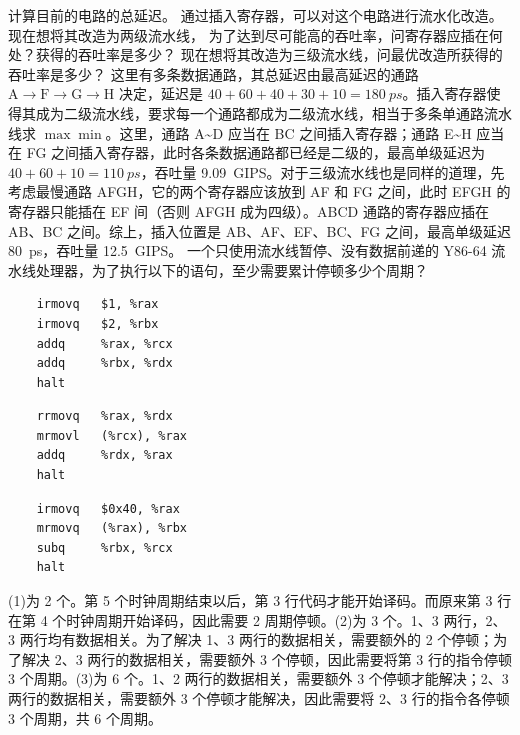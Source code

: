 \begin{problems}
\begin{figure}[H]
        \end{figure}
        \qn 计算目前的电路的总延迟。
        \qn 通过插入寄存器，可以对这个电路进行流水化改造。现在想将其改造为两级流水线， 为了达到尽可能高的吞吐率，问寄存器应插在何处？获得的吞吐率是多少？
        \qn 现在想将其改造为三级流水线，问最优改造所获得的吞吐率是多少？
        \sol 这里有多条数据通路，其总延迟由最高延迟的通路 $\mathrm A \to \mathrm F \to \mathrm G \to \mathrm H$ 决定，延迟是 $40+60+40+30+10 = \SI{180}{ps}$。插入寄存器使得其成为二级流水线，要求每一个通路都成为二级流水线，相当于多条单通路流水线求 $\max \min$。这里，通路 A\textasciitilde D 应当在 BC 之间插入寄存器；通路 E\textasciitilde H 应当在 FG 之间插入寄存器，此时各条数据通路都已经是二级的，最高单级延迟为 $40+60+10 = \SI{110}{ps}$，吞吐量 \SI{9.09}{GIPS}。对于三级流水线也是同样的道理，先考虑最慢通路 AFGH，它的两个寄存器应该放到 AF 和 FG 之间，此时 EFGH 的寄存器只能插在 EF 间（否则 AFGH 成为四级）。ABCD 通路的寄存器应插在 AB、BC 之间。综上，插入位置是 AB、AF、EF、BC、FG 之间，最高单级延迟 \SI{80}{ps}，吞吐量 \SI{12.5}{GIPS}。
        \pro 一个只使用流水线暂停、没有数据前递的 Y86-64 流水线处理器，为了执行以下的语句，至少需要累计停顿多少个周期？
            \qn
            \begin{verbatim}
    irmovq   $1, %rax
    irmovq   $2, %rbx
    addq     %rax, %rcx
    addq     %rbx, %rdx
    halt
            \end{verbatim}
            \qn
            \begin{verbatim}
    rrmovq   %rax, %rdx
    mrmovl   (%rcx), %rax
    addq     %rdx, %rax
    halt
            \end{verbatim}
            \qn
            \begin{verbatim}
    irmovq   $0x40, %rax
    mrmovq   (%rax), %rbx
    subq     %rbx, %rcx
    halt
            \end{verbatim}
        \sol (1)为 2 个。第 5 个时钟周期结束以后，第 3 行代码才能开始译码。而原来第 3 行在第 4 个时钟周期开始译码，因此需要 2 周期停顿。(2)为 3 个。1、3 两行，2、3 两行均有数据相关。为了解决 1、3 两行的数据相关，需要额外的 2 个停顿；为了解决 2、3 两行的数据相关，需要额外 3 个停顿，因此需要将第 3 行的指令停顿 3 个周期。(3)为 6 个。1、2 两行的数据相关，需要额外 3 个停顿才能解决；2、3 两行的数据相关，需要额外 3 个停顿才能解决，因此需要将 2、3 行的指令各停顿 3 个周期，共 6 个周期。

\end{problems}
